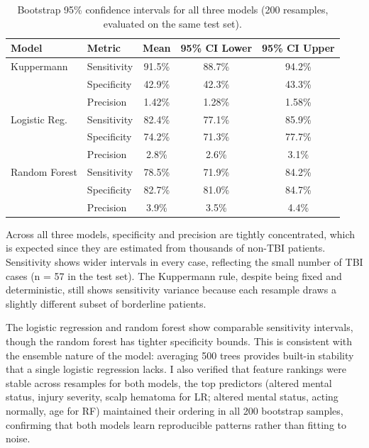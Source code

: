\documentclass[11pt,letterpaper]{article}
\begin{document}
\begin{table}[H]
\centering
\caption{Bootstrap 95\% confidence intervals for all three models (200 resamples, evaluated on the same test set).}
\label{tab:model_stability}
\small
\begin{tabular}{llccc}
\hline
\textbf{Model} & \textbf{Metric} & \textbf{Mean} & \textbf{95\% CI Lower} & \textbf{95\% CI Upper} \\
\hline
Kuppermann    & Sensitivity & 91.5\% & 88.7\% & 94.2\% \\
              & Specificity & 42.9\% & 42.3\% & 43.3\% \\
              & Precision   & 1.42\% & 1.28\% & 1.58\% \\
\hline
Logistic Reg. & Sensitivity & 82.4\% & 77.1\% & 85.9\% \\
              & Specificity & 74.2\% & 71.3\% & 77.7\% \\
              & Precision   & 2.8\%  & 2.6\%  & 3.1\% \\
\hline
Random Forest & Sensitivity & 78.5\% & 71.9\% & 84.2\% \\
              & Specificity & 82.7\% & 81.0\% & 84.7\% \\
              & Precision   & 3.9\%  & 3.5\%  & 4.4\% \\
\hline
\end{tabular}
\end{table}

Across all three models, specificity and precision are tightly concentrated, which is expected since they are estimated from thousands of non-TBI patients. Sensitivity shows wider intervals in every case, reflecting the small number of TBI cases (n = 57 in the test set). The Kuppermann rule, despite being fixed and deterministic, still shows sensitivity variance because each resample draws a slightly different subset of borderline patients.

The logistic regression and random forest show comparable sensitivity intervals, though the random forest has tighter specificity bounds. This is consistent with the ensemble nature of the model: averaging 500 trees provides built-in stability that a single logistic regression lacks. I also verified that feature rankings were stable across resamples for both models, the top predictors (altered mental status, injury severity, scalp hematoma for LR; altered mental status, acting normally, age for RF) maintained their ordering in all 200 bootstrap samples, confirming that both models learn reproducible patterns rather than fitting to noise.
\end{document}
